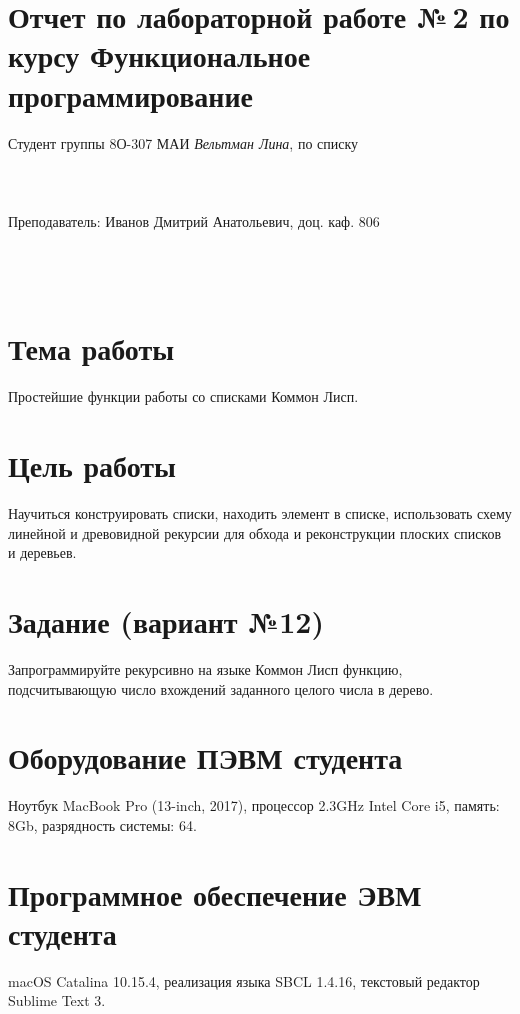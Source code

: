 \documentclass[12pt]{article}
\begin{document}
\section*{Отчет по лабораторной работе №\,2 
по курсу \guillemotleft  Функциональное программирование\guillemotright}
\begin{flushright}
Студент группы 8О-307 МАИ \textit{Вельтман Лина},  по списку \\
 \\
 \\
\ \\
Преподаватель: Иванов Дмитрий Анатольевич, доц. каф. 806 \\
 \\
 \\
 \\

\end{flushright}

\section{Тема работы}
Простейшие функции работы со списками Коммон Лисп.

\section{Цель работы}
Научиться конструировать списки, находить элемент в списке, использовать схему линейной и древовидной рекурсии для обхода и реконструкции плоских списков и деревьев.

\section{Задание (вариант №12)}
Запрограммируйте рекурсивно на языке Коммон Лисп функцию, подсчитывающую число вхождений заданного целого числа в дерево.

\section{Оборудование ПЭВМ студента}
Ноутбук MacBook Pro (13-inch, 2017), процессор 2.3GHz Intel Core i5, память: 8Gb, разрядность системы: 64.

\section{Программное обеспечение ЭВМ студента}
macOS Catalina 10.15.4, реализация языка SBCL 1.4.16, текстовый редактор Sublime Text 3.
\end{document}
